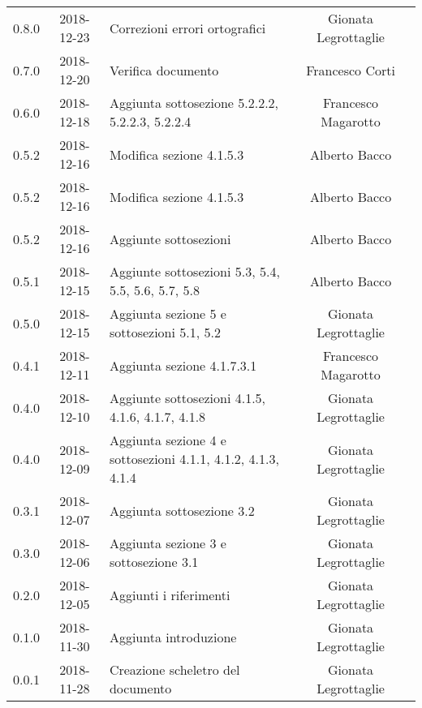{\begin{longtable}{ c c C{4cm}  c  c }
		0.8.0 & 2018-12-23 & Correzioni errori ortografici & Gionata Legrottaglie & \reda{} \\
		
		0.7.0 & 2018-12-20 & Verifica documento & Francesco Corti & \ver{}\\
		
		0.6.0 & 2018-12-18 & Aggiunta sottosezione 5.2.2.2, 5.2.2.3, 5.2.2.4 & Francesco Magarotto & \reda{} \\
		
		0.5.2 & 2018-12-16 & Modifica sezione 4.1.5.3 & Alberto Bacco & \reda{} \\
		
		0.5.2 & 2018-12-16 & Modifica sezione 4.1.5.3 & Alberto Bacco & \reda{} \\
		
		0.5.2 & 2018-12-16 & Aggiunte sottosezioni  & Alberto Bacco & \reda{} \\
		
		0.5.1 & 2018-12-15 & Aggiunte sottosezioni 5.3, 5.4, 5.5, 5.6, 5.7, 5.8 & Alberto Bacco & \reda{} \\
		
		0.5.0 & 2018-12-15 & Aggiunta sezione 5 e sottosezioni 5.1, 5.2 & Gionata Legrottaglie & \reda{} \\
		
		0.4.1 & 2018-12-11 & Aggiunta sezione 4.1.7.3.1 & Francesco Magarotto & \reda{} \\ 
		
		0.4.0 & 2018-12-10 & Aggiunte sottosezioni 4.1.5, 4.1.6, 4.1.7, 4.1.8 & Gionata Legrottaglie & \reda{} \\ 
		0.4.0 & 2018-12-09 & Aggiunta sezione 4 e sottosezioni 4.1.1, 4.1.2, 4.1.3, 4.1.4 & Gionata Legrottaglie & \reda{} \\ 
		
		0.3.1 & 2018-12-07 & Aggiunta sottosezione 3.2 & Gionata Legrottaglie & \reda{} \\ 
		
		0.3.0 & 2018-12-06 & Aggiunta sezione 3 e sottosezione 3.1 & Gionata Legrottaglie & \reda{} \\ 
		
		0.2.0 & 2018-12-05 & Aggiunti i riferimenti & Gionata Legrottaglie & \reda{} \\ 
		
		0.1.0 & 2018-11-30 & Aggiunta introduzione & Gionata Legrottaglie & \reda{} \\
		
		0.0.1 & 2018-11-28 & Creazione scheletro del documento & Gionata Legrottaglie & \reda{}\\
		
	\end{longtable}

}